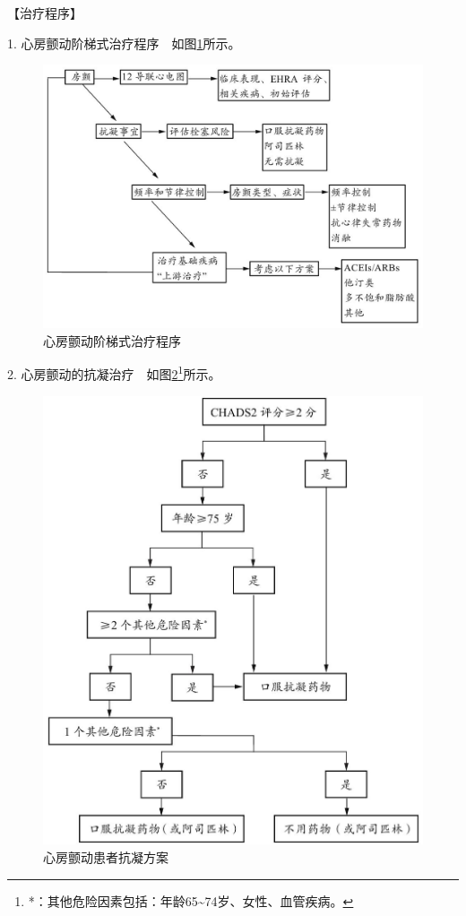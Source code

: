 【治疗程序】

1. 心房颤动阶梯式治疗程序　如图\ref{fig2-2-9}所示。

\begin{figure}[!htbp]
 \centering
 \includegraphics{./images/Image00054.jpg}
 \captionsetup{justification=centering}
 \caption{心房颤动阶梯式治疗程序}
 \label{fig2-2-9}
  \end{figure} 

2. 心房颤动的抗凝治疗　如图\ref{fig2-2-10}\footnote{*：其他危险因素包括：年龄65\textasciitilde{}74岁、女性、血管疾病。}所示。

\begin{figure}[!htbp]
 \centering
 \includegraphics{./images/Image00055.jpg}
 \captionsetup{justification=centering}
 \caption{心房颤动患者抗凝方案}
 \label{fig2-2-10}
  \end{figure} 



